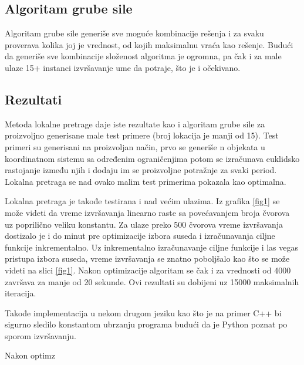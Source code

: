 \documentclass[a4paper]{article}
\begin{document}
\subsection{Algoritam grube sile}
Algoritam grube sile generiše sve moguće kombinacije rešenja i za svaku proverava kolika joj je vrednost, od kojih maksimalnu vraća kao rešenje. Budući da generiše sve kombinacije složenost algoritma je ogromna, pa čak i za male ulaze 15+ instanci izvršavanje ume da potraje, što je i očekivano.

\subsection{Rezultati}



Metoda lokalne pretrage daje iste rezultate kao i algoritam grube sile za proizvoljno generisane male test primere (broj lokacija je manji od 15). Test primeri su generisani na proizvoljan način, prvo se generiše n objekata u koordinatnom sistemu sa određenim ograničenjima potom se izračunava euklidsko rastojanje između njih i dodaju im se proizvoljne potražnje za svaki period. Lokalna pretraga se nad ovako malim test primerima pokazala kao optimalna.

Lokalna pretraga je takođe testirana i nad većim ulazima. Iz grafika \ref{fig1} se može videti da vreme izvršavanja linearno raste sa povećavanjem broja čvorova uz poprilično veliku konstantu. Za ulaze preko 500 čvorova vreme izvršavanja dostizalo je i do minut pre optimizacije izbora suseda i izračunavanja ciljne funkcije inkrementalno. Uz inkrementalno izračunavanje ciljne funkcije i las vegas pristupa izbora suseda, vreme izvršavanja se znatno poboljšalo kao što se može videti na slici \ref{fig1}. Nakon optimizacije algoritam se čak i za vrednosti od 4000 završava za manje od 20 sekunde. Ovi rezultati su dobijeni uz 15000 maksimalnih iteracija.


Takođe implementacija u nekom drugom jeziku kao što je na primer C++ bi sigurno sledilo konstantom ubrzanju programa budući da je Python poznat po sporom izvršavanju.

Nakon optimz
\end{document}
